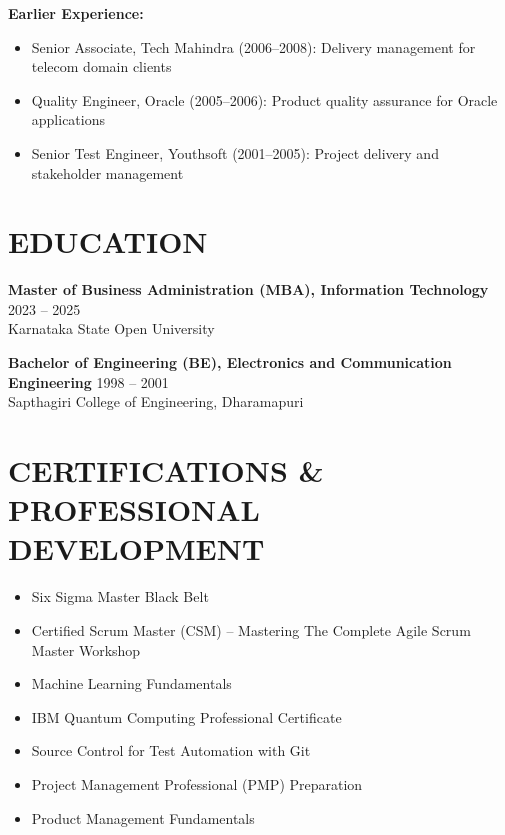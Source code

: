 \documentclass[11pt,a4paper]{article}
\begin{document}
\textbf{Earlier Experience:}
\begin{itemize}[leftmargin=*, itemsep=0pt]
    \item Senior Associate, Tech Mahindra (2006--2008): Delivery management for telecom domain clients
    \item Quality Engineer, Oracle (2005--2006): Product quality assurance for Oracle applications
    \item Senior Test Engineer, Youthsoft (2001--2005): Project delivery and stakeholder management
\end{itemize}

\section*{EDUCATION}
\textbf{Master of Business Administration (MBA), Information Technology} \hfill 2023 -- 2025\\
Karnataka State Open University

\textbf{Bachelor of Engineering (BE), Electronics and Communication Engineering} \hfill 1998 -- 2001\\
Sapthagiri College of Engineering, Dharamapuri

\section*{CERTIFICATIONS \& PROFESSIONAL DEVELOPMENT}
\begin{itemize}[leftmargin=*, itemsep=0pt]
    \item Six Sigma Master Black Belt
    \item Certified Scrum Master (CSM) -- Mastering The Complete Agile Scrum Master Workshop
    \item Machine Learning Fundamentals
    \item IBM Quantum Computing Professional Certificate
    \item Source Control for Test Automation with Git
    \item Project Management Professional (PMP) Preparation
    \item Product Management Fundamentals
\end{itemize}

\end{document}
